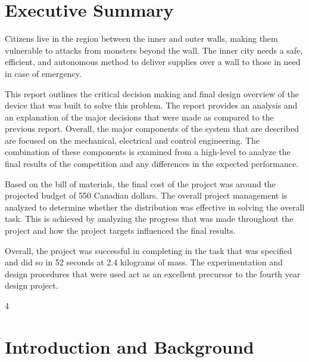 \documentclass[ece]{uw-wkrpt}
\let\oldsection\section
\renewcommand\section{\clearpage\oldsection}
\begin{document}
\clearpage
\thispagestyle{plain}

\setcounter{secnumdepth}{0}
\setcounter{page}{1}

\section{Executive Summary}\label{sec:summary}
\onehalfspacing
Citizens live in the region between the inner and outer walls, making them vulnerable to attacks from monsters beyond the wall. The inner city needs a safe, efficient, and autonomous method to deliver supplies over a wall to those in need in case of emergency.

This report outlines the critical decision making and final design overview of the device that was built to solve this problem. The report provides an analysis and an explanation of the major decisions that were made as compared to the previous report. Overall, the major components of the system that are described are focused on the mechanical, electrical and control engineering. The combination of these components is examined from a high-level to analyze the final results of the competition and any differences in the expected performance. 

Based on the bill of materials, the final cost of the project was around the projected budget of 550 Canadian dollars. The overall project management is analyzed to determine whether the distribution was effective in solving the overall task. This is achieved by analyzing the progress that was made throughout the project and how the project targets influenced the final results.  

Overall, the project was successful in completing in the task that was specified and did so in 52 seconds at 2.4 kilograms of mass. The experimentation and design procedures that were used act as an excellent precursor to the fourth year design project.


\setcounter{secnumdepth}{4}
\setcounter{tocdepth}4

\tableofcontents
\listoffigures
\listoftables



\mainmatter

% 
\section{Introduction and Background}
\end{document}
